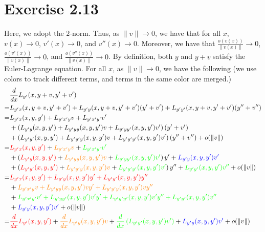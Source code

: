 \documentclass[11pt]{report}
\begin{document}
\section*{Exercise 2.13}
Here, we adopt the $2$-norm. Thus, as $\|v\| \to 0$, we have that for all $x$, $v(x) \to 0$, $v'(x) \to 0$, and $v''(x) \to 0$. Moreover, we have that $\frac{o(v(x))}{\|v(x)\|} \to 0$, $\frac{o(v'(x))}{\|v(x)\|} \to 0$, and $\frac{o(v''(x))}{\|v(x)\|} \to 0$. By definition, both $y$ and $y+v$ satisfy the Euler-Lagrange equation. For all $x$, as $\|v\| \to 0$, we have the following (we use colors to track different terms, and terms in the same color are merged.)
\newcommand{\one}[1]{\textcolor{red}{#1}}
\newcommand{\two}[1]{\textcolor{orange}{#1}}
\newcommand{\three}[1]{\textcolor{green}{#1}}
\newcommand{\four}[1]{\textcolor{blue}{#1}}
\begin{align*}
& \frac{d}{dx} L_{y'}(x, y+v, y'+v') \\
= & L_{y'x}(x, y+v, y'+v') + L_{y'y}(x, y+v, y'+v')(y'+v') + L_{y'y'}(x, y+v, y'+v')(y''+v'')\\
= &L_{y'x}(x, y, y') + L_{y'x'y}v + L_{y'x'y'}v'\\ &+ \left(L_{y'y}(x, y, y') + L_{y'yy}(x,y,y')v + L_{y'yy'}(x,y,y')v' \right)(y'+v')\\ &+ \left(L_{y'y'}(x, y, y') + L_{y'y'y}(x,y,y')v + L_{y'y'y'}(x,y,y')v' \right)(y''+v'') + o(\|v\|)\\
= & \one{L_{y'x}(x, y, y')} + \two{L_{y'x'y}v} + \three{L_{y'x'y'}v'}\\
&+ \left(\one{L_{y'y}(x, y, y')} + \two{L_{y'yy}(x,y,y')v} + \three{L_{y'yy'}(x,y,y')v'} \right)y' + \four{L_{y'y}(x, y, y')v'} \\
&+ \left(\one{L_{y'y'}(x, y, y')} + \two{L_{y'y'y}(x,y,y')v} + \three{L_{y'y'y'}(x,y,y')v'} \right)y'' + \three{L_{y'y'}(x, y, y')v''} + o(\|v\|)\\
= & \one{L_{y'x}(x, y, y') + L_{y'y}(x, y, y')y' + L_{y'y'}(x, y, y')y''}\\
 &+ \two{L_{y'x'y}v + L_{y'yy}(x,y,y')vy' + L_{y'y'y}(x,y,y')vy''}\\
 &+ \three{L_{y'x'y'}v' + L_{y'yy'}(x,y,y')v'y' + L_{y'y'y'}(x,y,y')v'y'' + L_{y'y'}(x, y, y')v''}\\
 &+ \four{L_{y'y}(x, y, y')v'} + o(\|v\|)\\
= & \one{\frac{d}{dx}L_{y'}(x,y,y')} + \two{\frac{d}{dx}L_{y'y}(x,y,y')v} + \three{\frac{d}{dx}\left(L_{y'y'}(x,y,y')v'\right)} + \four{L_{y'y}(x,y,y')v'} + o(\|v\|)
\end{align*}
\end{document}
